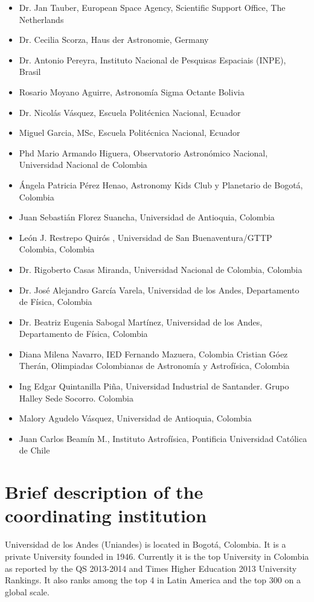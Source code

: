 \documentclass[12pt]{article}
\begin{document}
\begin{itemize}
\item Dr. Jan Tauber, European Space Agency, Scientific Support
  Office, The Netherlands 
\item Dr. Cecilia Scorza, Haus der Astronomie, Germany
\item Dr. Antonio Pereyra, Instituto Nacional de Pesquisas Espaciais
  (INPE), Brasil 
\item Rosario Moyano Aguirre, Astronomía Sigma Octante Bolivia 
\item Dr. Nicolás Vásquez, Escuela Politécnica Nacional, Ecuador
\item Miguel Garcia, MSc, Escuela Politécnica Nacional, Ecuador
\item Phd Mario Armando Higuera, Observatorio Astronómico Nacional,
  Universidad Nacional de Colombia 
\item Ángela Patricia Pérez Henao, Astronomy Kids Club y Planetario de
  Bogotá, Colombia 
\item Juan Sebastián Florez Suancha, Universidad de Antioquia, Colombia
\item León J. Restrepo Quirós , Universidad de San Buenaventura/GTTP
  Colombia, Colombia 
\item Dr. Rigoberto Casas Miranda, Universidad Nacional de Colombia, Colombia
\item Dr. José Alejandro García Varela, Universidad de los Andes,
  Departamento de Física, Colombia 
\item Dr. Beatriz Eugenia Sabogal Martínez, Universidad de los Andes,
  Departamento de Física, Colombia 
\item Diana Milena Navarro, IED Fernando Mazuera, Colombia
Cristian Góez Therán, Olimpiadas Colombianas de Astronomía y
Astrofísica, Colombia 
\item Ing Edgar Quintanilla Piña, Universidad Industrial de
  Santander. Grupo Halley Sede Socorro. Colombia 
\item Malory Agudelo Vásquez, Universidad de Antioquia, Colombia
\item Juan Carlos Beamín M., Instituto Astrofísica, Pontificia
  Universidad Católica de Chile 
\end{itemize}


\section{Brief description of the coordinating institution}

Universidad de los Andes (Uniandes) is located in Bogotá, Colombia. It
is a private University founded in 1946. Currently it is the top
University in Colombia as reported by the QS 2013-2014 and Times
Higher Education 2013 University Rankings. It also ranks among the top 4 in
Latin America and the top 300 on a global scale.   
\end{document}
